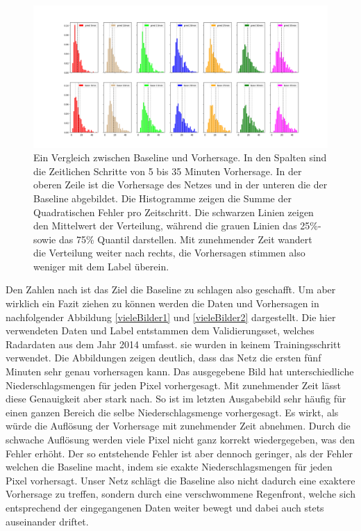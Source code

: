 \begin{figure}[h]
	\includegraphics[width=\linewidth]{pics/35min_vgl_baseline}
	\caption[Vergleich zwischen Baseline und UNet (35 Minuten Vorhersage)]{Ein Vergleich zwischen Baseline und Vorhersage. In den Spalten sind die Zeitlichen Schritte von 5 bis 35 Minuten Vorhersage. In der oberen Zeile ist die Vorhersage des Netzes und in der unteren die der Baseline abgebildet. Die Histogramme zeigen die Summe der Quadratischen Fehler pro Zeitschritt. Die schwarzen Linien zeigen den Mittelwert der Verteilung, während die grauen Linien das 25\%- sowie das 75\% Quantil darstellen. Mit zunehmender Zeit wandert die Verteilung weiter nach rechts, die Vorhersagen stimmen also weniger mit dem Label überein.}
	\label{35vglbasepred}
\end{figure}

Den Zahlen nach ist das Ziel die Baseline zu schlagen also geschafft. Um aber wirklich ein Fazit ziehen zu können werden die Daten und Vorhersagen in nachfolgender Abbildung \ref{vieleBilder1} und \ref{vieleBilder2} dargestellt.
Die hier verwendeten Daten und Label entstammen dem Validierungsset, welches Radardaten aus dem Jahr 2014 umfasst. sie wurden in keinem Trainingsschritt verwendet.
Die Abbildungen zeigen deutlich, dass das Netz die ersten fünf Minuten sehr genau vorhersagen kann. Das ausgegebene Bild hat unterschiedliche Niederschlagsmengen für jeden Pixel vorhergesagt. Mit zunehmender Zeit lässt diese Genauigkeit aber stark nach. So ist im letzten Ausgabebild sehr häufig für einen ganzen Bereich die selbe Niederschlagsmenge vorhergesagt. Es wirkt, als würde die Auflösung der Vorhersage mit zunehmender Zeit abnehmen. Durch die schwache Auflösung werden viele Pixel nicht ganz korrekt wiedergegeben, was den Fehler erhöht. Der so entstehende Fehler ist aber dennoch geringer, als der Fehler welchen die Baseline macht, indem sie exakte Niederschlagsmengen für jeden Pixel vorhersagt. Unser Netz schlägt die Baseline also nicht dadurch eine exaktere Vorhersage zu treffen, sondern durch eine verschwommene Regenfront, welche sich entsprechend der eingegangenen Daten weiter bewegt und dabei auch stets auseinander driftet.


